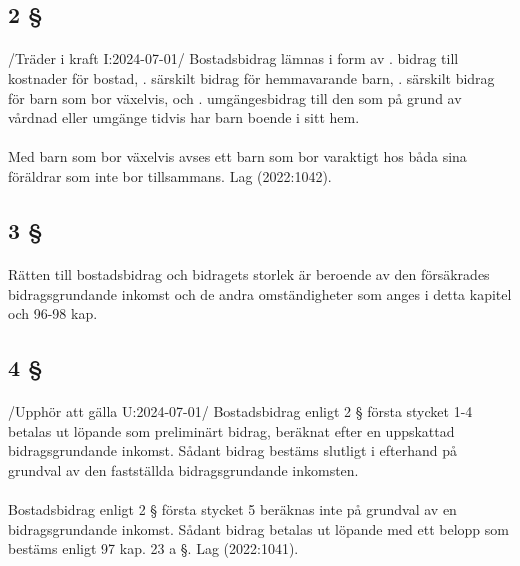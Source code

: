 \documentclass[a4paper,notitlepage,openany,10pt]{book}
\begin{document}
\subsection*{2 §}
\paragraph*{}
/Träder i kraft I:2024-07-01/
Bostadsbidrag lämnas i form av
. bidrag till kostnader för bostad,
. särskilt bidrag för hemmavarande barn,
. särskilt bidrag för barn som bor växelvis, och
. umgängesbidrag till den som på grund av vårdnad eller umgänge tidvis har barn boende i sitt hem.
\paragraph*{}
Med barn som bor växelvis avses ett barn som bor varaktigt hos båda sina föräldrar som inte bor tillsammans.
Lag (2022:1042).
\subsection*{3 §}
\paragraph*{}
Rätten till bostadsbidrag och bidragets storlek är beroende av den försäkrades bidragsgrundande inkomst och de andra omständigheter som anges i detta kapitel och 96-98 kap.
\subsection*{4 §}
\paragraph*{}
/Upphör att gälla U:2024-07-01/
Bostadsbidrag enligt 2 § första stycket 1-4 betalas ut löpande som preliminärt bidrag, beräknat efter en uppskattad bidragsgrundande inkomst. Sådant bidrag bestäms slutligt i efterhand på grundval av den fastställda bidragsgrundande inkomsten.
\paragraph*{}
Bostadsbidrag enligt 2 § första stycket 5 beräknas inte på grundval av en bidragsgrundande inkomst. Sådant bidrag betalas ut löpande med ett belopp som bestäms enligt 97 kap. 23 a §.
Lag (2022:1041).
\end{document}
